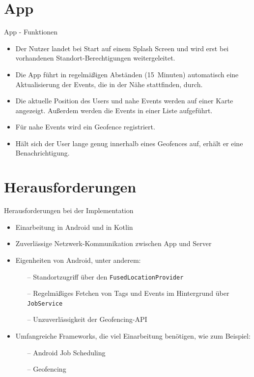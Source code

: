 \documentclass{beamer}
\begin{document}
	\section{App}
	\begin{frame}{App - Funktionen}
		\begin{itemize}
			\item Der Nutzer landet bei Start auf einem Splash Screen und wird erst bei vorhandenen Standort-Berechtigungen weitergeleitet.\pause
			\item Die App führt in regelmäßigen Abständen (15~Minuten) automatisch eine Aktualisierung der Events, die in der Nähe stattfinden, durch.
			\item Die aktuelle Position des Users und nahe Events werden auf einer \alert{Karte} angezeigt. Außerdem werden die Events in einer Liste aufgeführt.\pause
			\item Für nahe Events wird ein \alert{Geofence} registriert.
			\item Hält sich der User lange genug innerhalb eines Geofences auf, erhält er eine \alert{Benachrichtigung}.
		\end{itemize}
	\end{frame}

	\section{Herausforderungen}
	\begin{frame}{Herausforderungen bei der Implementation}
		\begin{itemize}
			\item Einarbeitung in Android und in Kotlin
			\item Zuverlässige Netzwerk-Kommunikation zwischen App und Server
			\item Eigenheiten von Android, unter anderem:
				\begin{itemize}
					\item[--] Standortzugriff über den \texttt{FusedLocationProvider}
					\item[--] Regelmäßiges Fetchen von Tags und Events im Hintergrund über \texttt{JobService}
					\item[--] Unzuverlässigkeit der Geofencing-API
				\end{itemize}
			\item Umfangreiche Frameworks, die viel Einarbeitung benötigen, wie zum Beispiel:
				\begin{itemize}
					\item[--] Android Job Scheduling
					\item[--] Geofencing
				\end{itemize}
		\end{itemize}
	\end{frame}
	
\end{document}

